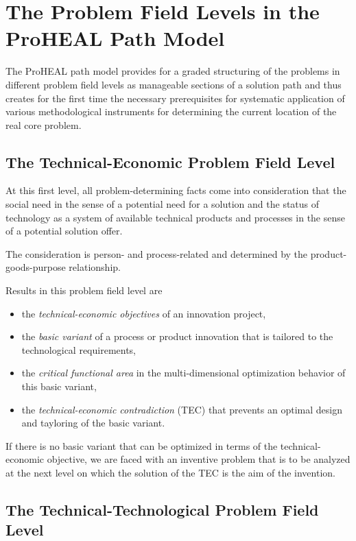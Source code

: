 \documentclass[11pt,a4paper]{article}
\begin{document}
\section{The Problem Field Levels in the ProHEAL Path Model}

The ProHEAL path model provides for a graded structuring of the problems in
different problem field levels as manageable sections of a solution path and
thus creates for the first time the necessary prerequisites for systematic
application of various methodological instruments for determining the current
location of the real core problem.

\subsection{The Technical-Economic Problem Field Level}

At this first level, all problem-determining facts come into consideration
that the social need in the sense of a potential need for a solution and the
status of technology as a system of available technical products and processes
in the sense of a potential solution offer.

The consideration is person- and process-related and determined by the
product-goods-purpose relationship.

Results in this problem field level are
\begin{itemize}
\item the \emph{technical-economic objectives} of an innovation project,
\item the \emph{basic variant} of a process or product innovation that is
  tailored to the technological requirements,
\item the \emph{critical functional area} in the multi-dimensional
  optimization behavior of this basic variant,
\item the \emph{technical-economic contradiction} (TEC) that prevents an
  optimal design and tayloring of the basic variant.
\end{itemize}
If there is no basic variant that can be optimized in terms of the
technical-economic objective, we are faced with an inventive problem that is
to be analyzed at the next level on which the solution of the TEC is the aim
of the invention.

\subsection{The Technical-Technological Problem Field Level}
\end{document}
